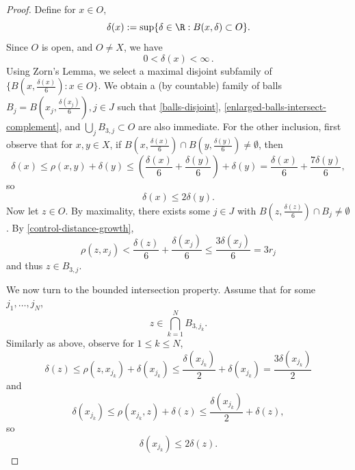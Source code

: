 \begin{proof}
\leanok
Define for $x\in O$,
\begin{equation}
    \delta(x):= \sup \{\delta\in\R : B(x,\delta)\subset O\}.
\end{equation}
Since $O$ is open, and $O\ne X$, we have
\begin{equation}
    0 < \delta(x) < \infty \,.
\end{equation}
Using Zorn's Lemma, we select a maximal disjoint subfamily of $\{B(x,\frac{\delta(x)}{6}) : x \in O\}$.
We obtain a (by  countable) family of balls $B_j = B(x_j, \frac{\delta(x_j)}{6}), j \in J$ such that \eqref{balls-disjoint}, \eqref{enlarged-balls-intersect-complement}, and $\bigcup_j B_{3,j} \subset O$ are also immediate. For the other inclusion, first observe that for $x,y\in X$,  if $B(x,\frac{\delta(x)}{6}) \cap B(y,\frac{\delta(y)}{6}) \ne \emptyset$, then
\begin{equation*}
    \delta(x) \le \rho(x,y) + \delta(y) \le (\frac{\delta(x)}{6} + \frac{\delta(y)}{6}) + \delta(y) = \frac{\delta(x)}{6} + \frac{7\delta(y)}{6},
\end{equation*}
so
\begin{equation}
    \label{control-distance-growth}
    \delta(x) \le 2 \delta(y).
\end{equation}
Now let $z\in O$. By maximality, there exists some $j\in J$ with $B(z,\frac{\delta(z)}{6}) \cap B_j \ne \emptyset$. By \eqref{control-distance-growth},
\begin{equation*}
    \rho(z,x_j)< \frac{\delta(z)}{6} + \frac{\delta(x_j)}{6} \le \frac{3\delta(x_j)}{6} = 3r_j
\end{equation*}
and thus $z\in B_{3,j}$.

We now turn to the bounded intersection property. Assume that for some $j_1,\dots,j_N$,
\begin{equation}
    z\in \bigcap_{k=1}^N B_{3,j_k}.
\end{equation}
Similarly as above, observe for $1\le k \le N$,
\begin{equation}
    \label{control-distance-growth-b}
    \delta(z) \le \rho(z,x_{j_k}) + \delta(x_{j_k}) \le \frac{\delta(x_{j_k})}{2} + \delta(x_{j_k}) = \frac{3\delta(x_{j_k})}{2}
\end{equation}
and
\begin{equation*}
    \delta(x_{j_k}) \le \rho(x_{j_k},z) + \delta(z) \le \frac{\delta(x_{j_k})}{2} + \delta(z),
\end{equation*}
so
\begin{equation}
    \label{control-distance-growth-c}
    \delta(x_{j_k}) \le 2 \delta(z).
\end{equation}


\end{proof}
